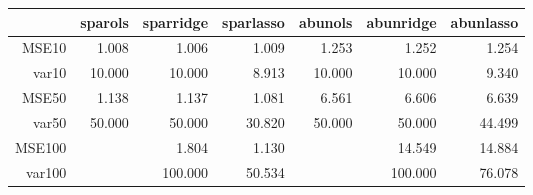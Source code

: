 \begin{table}[ht]
\centering
\begin{tabular}{rrrrrrr}
  \hline
 & sparols & sparridge & sparlasso & abunols & abunridge & abunlasso \\ 
  \hline
MSE10 & 1.008 & 1.006 & 1.009 & 1.253 & 1.252 & 1.254 \\ 
  var10 & 10.000 & 10.000 & 8.913 & 10.000 & 10.000 & 9.340 \\ 
  MSE50 & 1.138 & 1.137 & 1.081 & 6.561 & 6.606 & 6.639 \\ 
  var50 & 50.000 & 50.000 & 30.820 & 50.000 & 50.000 & 44.499 \\ 
  MSE100 &  & 1.804 & 1.130 &  & 14.549 & 14.884 \\ 
  var100 &  & 100.000 & 50.534 &  & 100.000 & 76.078 \\ 
   \hline
\end{tabular}
\end{table}
